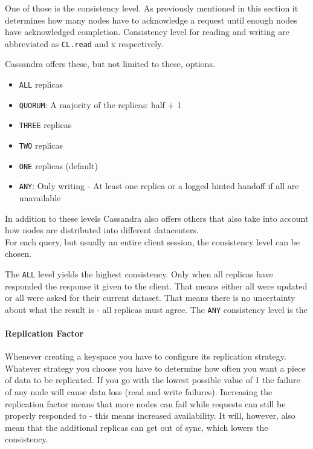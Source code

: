 One of those is the consistency level. As previously mentioned in this section it determines how many nodes have to acknowledge a request until enough nodes have acknowledged completion. Consistency level for reading and writing are abbreviated as \texttt{CL.read} and x respectively.

Cassandra offers these, but not limited to these, options.

\begin{itemize}
  \item \texttt{ALL} replicas
  \item \texttt{QUORUM}: A majority of the replicas: half + 1
  \item \texttt{THREE} replicas
  \item \texttt{TWO} replicas
  \item \texttt{ONE} replicas (default)
  \item \texttt{ANY}: Only writing - At least one replica or a logged hinted handoff if all are unavailable
\end{itemize}

In addition to these levels Cassandra also offers others that also take into account how nodes are distributed into different datacenters. \\
For each query, but usually an entire client session, the consistency level can be chosen.

The \texttt{ALL} level yields the highest consistency. Only when all replicas have responded the response it given to the client. That means either all were updated or all were asked for their current dataset. That means there is no uncertainty about what the result is - all replicas must agree. The \texttt{ANY} consistency level is the

\paragraph{Replication Factor} Whenever creating a keyspace you have to configure its replication strategy. Whatever strategy you choose you have to determine how often you want a piece of data to be replicated. If you go with the lowest possible value of 1 the failure of any node will cause data loss (read and write failures). Increasing the replication factor means that more nodes can fail while requests can still be properly responded to - this means increased availability. It will, however, also mean that the additional replicas can get out of sync, which lowers the consistency.

